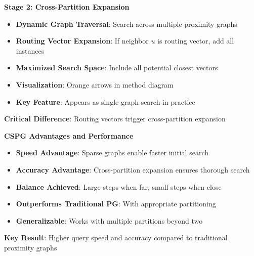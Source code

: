 \begin{frame}
\begin{center}
\Large\textbf{Stage 2: Cross-Partition Expansion}
\end{center}

\vspace{0.3cm}

\begin{itemize}
    \item \textbf{Dynamic Graph Traversal}: Search across multiple proximity graphs
    \item \textbf{Routing Vector Expansion}: If neighbor $u$ is routing vector, add all instances
    \item \textbf{Maximized Search Space}: Include all potential closest vectors
    \item \textbf{Visualization}: Orange arrows in method diagram
    \item \textbf{Key Feature}: Appears as single graph search in practice
\end{itemize}

\vspace{0.3cm}

\textbf{Critical Difference}: Routing vectors trigger cross-partition expansion
\end{frame}%
\begin{frame}
\begin{center}
\Large\textbf{CSPG Advantages and Performance}
\end{center}

\vspace{0.3cm}

\begin{itemize}
    \item \textbf{Speed Advantage}: Sparse graphs enable faster initial search
    \item \textbf{Accuracy Advantage}: Cross-partition expansion ensures thorough search
    \item \textbf{Balance Achieved}: Large steps when far, small steps when close
    \item \textbf{Outperforms Traditional PG}: With appropriate partitioning
    \item \textbf{Generalizable}: Works with multiple partitions beyond two
\end{itemize}

\vspace{0.3cm}

\textbf{Key Result}: Higher query speed and accuracy compared to traditional proximity graphs
\end{frame}%
